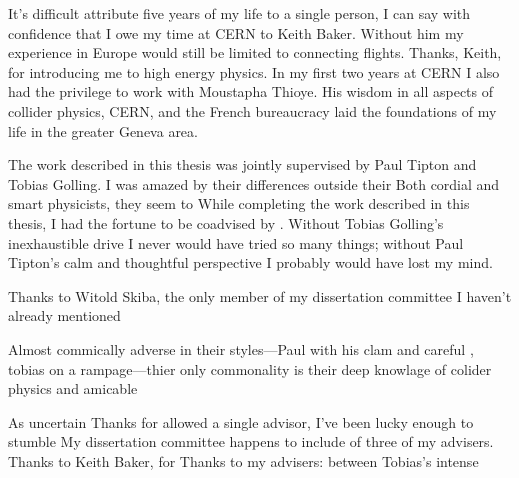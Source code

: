 

It's difficult attribute five years of my life to a single person, I can say with confidence that I owe my time at CERN to Keith Baker.
Without him my experience in Europe would still be limited to connecting flights.
Thanks, Keith, for introducing me to high energy physics.
In my first two years at CERN I also had the privilege to work with Moustapha Thioye.
His wisdom in all aspects of collider physics, CERN, and the French bureaucracy laid the foundations of my life in the greater Geneva area.

The work described in this thesis was jointly supervised by Paul Tipton and Tobias Golling.
I was amazed by their differences outside their 
Both cordial and smart physicists, they seem to 
While completing the work described in this thesis, I had the fortune to be coadvised by .
Without Tobias Golling's inexhaustible drive I never would have tried so many things; without Paul Tipton's calm and thoughtful perspective I probably would have lost my mind.

Thanks to Witold Skiba, the only member of my dissertation committee I haven't already mentioned

Almost commically adverse in their styles---Paul with his clam and careful , tobias on a rampage---thier only commonality is their deep knowlage of colider physics and amicable 


As uncertain 
Thanks for 
  allowed a single advisor, I've been lucky enough to stumble My dissertation committee happens to include of three of my advisers. Thanks to Keith Baker, for 
Thanks to my advisers: between Tobias's intense 
